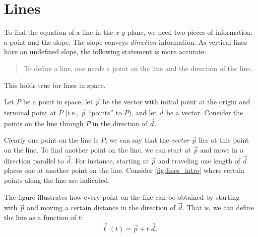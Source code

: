 \section{Lines}\label{sec:lines}

To find the equation of a line in the $x$-$y$ plane, we need two pieces of information: a point and the slope. The slope conveys \emph{direction} information. As vertical lines have an undefined slope, the following statement is more accurate:

\begin{quotation}
\noindent To define a line, one needs a point on the line and the direction of the line.
\end{quotation}

This holds true for lines in space.\bigskip

Let $P$ be a point in space, let $\vec p$ be the vector with initial point at the origin and terminal point at $P$ (i.e., $\vec p$ ``points'' to $P$), and let $\vec d$ be a vector. Consider the points on the line through $P$ in the direction of $\vec d$. 

Clearly one point on the line is $P$; we can say that the \emph{vector} $\vec p$ lies at this point on the line. To find another point on the line, we can start at $\vec p$ and move in a  direction parallel to $\vec d$. For instance, starting at $\vec p$ and traveling one length of $\vec d$ places one at another point on the line. Consider \autoref{fig:lines_intro} where certain points along the line are indicated.


The figure illustrates how every point on the line can be obtained by starting with $\vec p$ and moving a certain distance in the direction of $\vec d$. That is, we can define the line as a function of $t$:
\begin{equation}
\vec\ell(t) = \vec p + t\ \vec d.\label{eq:lines1}
\end{equation}

